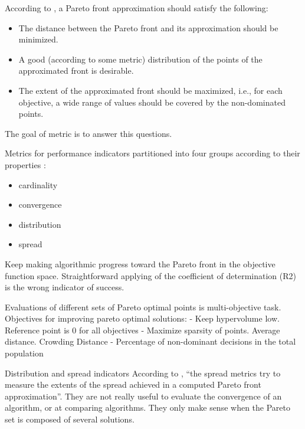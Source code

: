             According to \cite{ZitzlerDT00}, a Pareto front approximation should satisfy the following:
            \begin{itemize}
                \item The distance between the Pareto front and its approximation should be minimized.
                \item A good (according to some metric) distribution of the points of the approximated front is desirable.
                \item The extent of the approximated front should be maximized, i.e., for each objective, a wide range of values should be covered by the non-dominated points.
            \end{itemize}

            The goal of metric is to answer this questions.  

            Metrics for performance indicators partitioned into four groups according to their properties \cite{Audet2018PerformanceII}: 
            \begin{itemize}
                \item cardinality
                \item convergence
                \item distribution
                \item spread
            \end{itemize}
        
            Keep making algorithmic progress toward the Pareto front in the objective function space.
            Straightforward applying of the coefficient of determination (R2) is the wrong indicator of success. 
        
            Evaluations of different sets of Pareto optimal points is multi-objective task.
            Objectives for improving pareto optimal solutions:
            - Keep hypervolume low. Reference point is 0 for all objectives
            - Maximize sparsity of points. Average distance. Crowding Distance
            - Percentage of non-dominant decisions in the total population
        
            Distribution and spread indicators According to \cite{CustodioMVV11}, “the spread metrics try to measure the extents of the spread achieved in a computed Pareto front approximation”. They are not really useful to evaluate the convergence of an algorithm, or at comparing algorithms. They only make sense when the Pareto set is composed of several solutions.
        
